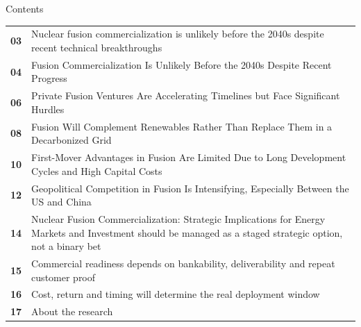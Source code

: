 \documentclass[10pt,a4paper]{article}
\begin{document}
\clearpage
{\sffamily\fontsize{26}{31}\selectfont\color{BONavy} Contents}\par\vspace{10pt}
\begin{tabularx}{\linewidth}{p{14mm}Y}
\textcolor{BOGreen}{\bfseries 03} & Nuclear fusion commercialization is unlikely before the 2040s despite recent technical breakthroughs \\[5pt]
\textcolor{BOGreen}{\bfseries 04} & Fusion Commercialization Is Unlikely Before the 2040s Despite Recent Progress \\[5pt]
\textcolor{BOGreen}{\bfseries 06} & Private Fusion Ventures Are Accelerating Timelines but Face Significant Hurdles \\[5pt]
\textcolor{BOGreen}{\bfseries 08} & Fusion Will Complement Renewables Rather Than Replace Them in a Decarbonized Grid \\[5pt]
\textcolor{BOGreen}{\bfseries 10} & First-Mover Advantages in Fusion Are Limited Due to Long Development Cycles and High Capital Costs \\[5pt]
\textcolor{BOGreen}{\bfseries 12} & Geopolitical Competition in Fusion Is Intensifying, Especially Between the US and China \\[5pt]
\textcolor{BOGreen}{\bfseries 14} & Nuclear Fusion Commercialization: Strategic Implications for Energy Markets and Investment should be managed as a staged strategic option, not a binary bet \\[5pt]
\textcolor{BOGreen}{\bfseries 15} & Commercial readiness depends on bankability, deliverability and repeat customer proof \\[5pt]
\textcolor{BOGreen}{\bfseries 16} & Cost, return and timing will determine the real deployment window \\[5pt]
\textcolor{BOGreen}{\bfseries 17} & About the research \\[5pt]
\end{tabularx}
\clearpage
\end{document}
